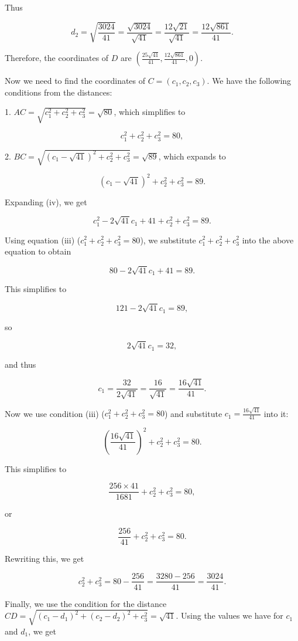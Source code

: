 Thus

\[ d_2 = \sqrt{\frac{3024}{41}} = \frac{\sqrt{3024}}{\sqrt{41}} = \frac{12 \sqrt{21}}{\sqrt{41}} = \frac{12 \sqrt{861}}{41}. \]

Therefore, the coordinates of $D$ are $\left(\frac{25 \sqrt{41}}{41}, \frac{12 \sqrt{861}}{41}, 0\right)$.

Now we need to find the coordinates of $C = (c_1, c_2, c_3)$. We have the following conditions from the distances:

1. $AC = \sqrt{c_1^2 + c_2^2 + c_3^2} = \sqrt{80}$, which simplifies to

\[ c_1^2 + c_2^2 + c_3^2 = 80, \tag*{(iii)} \]

2. $BC = \sqrt{(c_1 - \sqrt{41})^2 + c_2^2 + c_3^2} = \sqrt{89}$, which expands to

\[ (c_1 - \sqrt{41})^2 + c_2^2 + c_3^2 = 89. \tag*{(iv)} \]

Expanding (iv), we get

\[ c_1^2 - 2 \sqrt{41} c_1 + 41 + c_2^2 + c_3^2 = 89. \]

Using equation (iii) ($c_1^2 + c_2^2 + c_3^2 = 80$), we substitute $c_1^2 + c_2^2 + c_3^2$ into the above equation to obtain

\[ 80 - 2 \sqrt{41} c_1 + 41 = 89. \]

This simplifies to

\[ 121 - 2 \sqrt{41} c_1 = 89, \]

so

\[ 2 \sqrt{41} c_1 = 32, \]

and thus

\[ c_1 = \frac{32}{2 \sqrt{41}} = \frac{16}{\sqrt{41}} = \frac{16 \sqrt{41}}{41}. \tag*{(v)} \]

Now we use condition (iii) ($c_1^2 + c_2^2 + c_3^2 = 80$) and substitute $c_1 = \frac{16 \sqrt{41}}{41}$ into it:

\[ \left(\frac{16 \sqrt{41}}{41}\right)^2 + c_2^2 + c_3^2 = 80. \]

This simplifies to

\[ \frac{256 \times 41}{1681} + c_2^2 + c_3^2 = 80, \]

or

\[ \frac{256}{41} + c_2^2 + c_3^2 = 80. \]

Rewriting this, we get

\[ c_2^2 + c_3^2 = 80 - \frac{256}{41} = \frac{3280 - 256}{41} = \frac{3024}{41}. \tag*{(vi)} \]

Finally, we use the condition for the distance $CD = \sqrt{(c_1 - d_1)^2 + (c_2 - d_2)^2 + c_3^2} = \sqrt{41}$. Using the values we have for $c_1$ and $d_1$, we get

